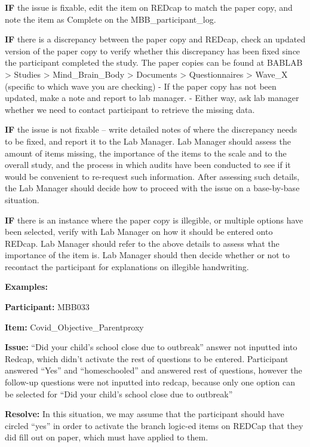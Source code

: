 \documentclass[]{book}
\begin{document}
\textbf{IF} the issue is fixable, edit the item on REDcap to match the paper copy, and note the item as Complete on the MBB\_participant\_log.

\textbf{IF} there is a discrepancy between the paper copy and REDcap, check an updated version of the paper copy to verify whether this discrepancy has been fixed since the participant completed the study. The paper copies can be found at BABLAB \textgreater{} Studies \textgreater{} Mind\_Brain\_Body \textgreater{} Documents \textgreater{} Questionnaires \textgreater{} Wave\_X (specific to which wave you are checking)
- If the paper copy has not been updated, make a note and report to lab manager.
- Either way, ask lab manager whether we need to contact participant to retrieve the missing data.

\textbf{IF} the issue is not fixable -- write detailed notes of where the discrepancy needs to be fixed, and report it to the Lab Manager. Lab Manager should assess the amount of items missing, the importance of the items to the scale and to the overall study, and the process in which audits have been conducted to see if it would be convenient to re-request such information. After assessing such details, the Lab Manager should decide how to proceed with the issue on a base-by-base situation.

\textbf{IF} there is an instance where the paper copy is illegible, or multiple options have been selected, verify with Lab Manager on how it should be entered onto REDcap. Lab Manager should refer to the above details to assess what the importance of the item is. Lab Manager should then decide whether or not to recontact the participant for explanations on illegible handwriting.

\textbf{Examples:}

\textbf{Participant:} MBB033

\textbf{Item:} Covid\_Objective\_Parentproxy

\textbf{Issue:} ``Did your child's school close due to outbreak'' answer not inputted into Redcap, which didn't activate the rest of questions to be entered. Participant answered ``Yes'' and ``homeschooled'' and answered rest of questions, however the follow-up questions were not inputted into redcap, because only one option can be selected for ``Did your child's school close due to outbreak''

\textbf{Resolve:} In this situation, we may assume that the participant should have circled ``yes'' in order to activate the branch logic-ed items on REDCap that they did fill out on paper, which must have applied to them.
\end{document}
